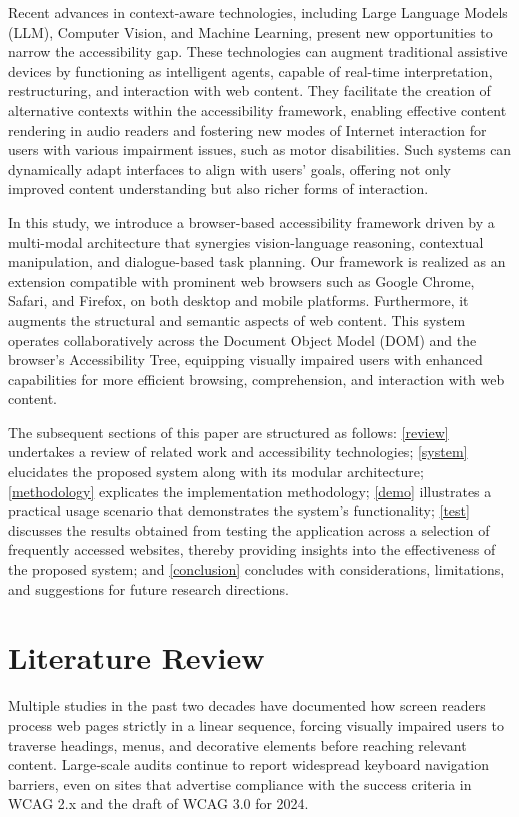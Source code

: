 \documentclass[conference]{IEEEtran}
\begin{document}
Recent advances in context-aware technologies, including Large Language Models (LLM), Computer Vision, and Machine Learning, present new opportunities to narrow the accessibility gap. These technologies can augment traditional assistive devices by functioning as intelligent agents, capable of real-time interpretation, restructuring, and interaction with web content. They facilitate the creation of alternative contexts within the accessibility framework, enabling effective content rendering in audio readers and fostering new modes of Internet interaction for users with various impairment issues, such as motor disabilities. Such systems can dynamically adapt interfaces to align with users' goals, offering not only improved content understanding but also richer forms of interaction.

In this study, we introduce a browser-based accessibility framework driven by a multi-modal architecture that synergies vision-language reasoning, contextual manipulation, and dialogue-based task planning. Our framework is realized as an extension compatible with prominent web browsers such as Google Chrome, Safari, and Firefox, on both desktop and mobile platforms. Furthermore, it augments the structural and semantic aspects of web content. This system operates collaboratively across the Document Object Model (DOM) and the browser's Accessibility Tree, equipping visually impaired users with enhanced capabilities for more efficient browsing, comprehension, and interaction with web content.

The subsequent sections of this paper are structured as follows: \autoref{review} undertakes a review of related work and accessibility technologies; \autoref{system} elucidates the proposed system along with its modular architecture; \autoref{methodology} explicates the implementation methodology; \autoref{demo} illustrates a practical usage scenario that demonstrates the system's functionality; \autoref{test} discusses the results obtained from testing the application across a selection of frequently accessed websites, thereby providing insights into the effectiveness of the proposed system; and \autoref{conclusion} concludes with considerations, limitations, and suggestions for future research directions.


\section{Literature Review}\label{review}

Multiple studies in the past two decades have documented how screen readers process web pages strictly in a linear sequence, forcing visually impaired users to traverse headings, menus, and decorative elements before reaching relevant content. \cite{Ramakrishnan2017-rn, wcagchallenges2025, martins2024large, abuaddous2016web} Large‑scale audits continue to report widespread keyboard navigation barriers, even on sites that advertise compliance with the success criteria in WCAG 2.x and the draft of WCAG 3.0 for 2024.\cite{wcagchallenges2025}
\end{document}
